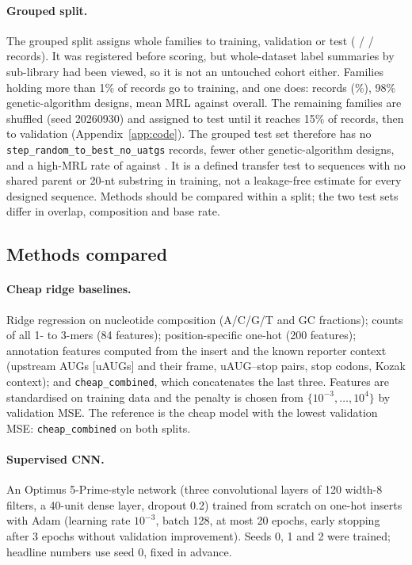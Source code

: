 \documentclass[11pt]{article}
\newcommand{\m}[1]{\texttt{#1}}
\begin{document}
\paragraph{Grouped split.} The grouped split assigns whole families to training, validation or test
(\GrpTrain{} / \GrpVal{} / \GrpTest{} records). It was registered before scoring, but whole-dataset label
summaries by sub-library had been viewed, so it is not an untouched cohort either. Families holding more than 1\%
of records go to training, and one does: \LargestComponent{} records (\LargestShare\%), 98\% genetic-algorithm
designs, mean MRL \LargestMean{} against \AllMean{} overall. The remaining families are shuffled (seed 20260930)
and assigned to test until it reaches 15\% of records, then to validation (Appendix~\ref{app:code}). The grouped
test set therefore has no \m{step\_random\_to\_best\_no\_uatgs} records, fewer other genetic-algorithm designs, and
a high-MRL rate of \GrpBase{} against \RandBase{}. It is a defined transfer test to sequences with no shared parent
or 20-nt substring in training, not a leakage-free estimate for every designed sequence. Methods should be
compared within a split; the two test sets differ in overlap, composition and base rate.

\subsection{Methods compared}\label{sec:models}
\paragraph{Cheap ridge baselines.} Ridge regression on nucleotide composition (A/C/G/T and GC fractions); counts of
all 1- to 3-mers (84 features); position-specific one-hot (200 features); annotation features computed from the
insert and the known reporter context (upstream AUGs [uAUGs] and their frame, uAUG--stop pairs, stop codons,
Kozak context); and \m{cheap\_combined}, which concatenates the last three. Features are standardised on training
data and the penalty is chosen from $\{10^{-3}, \dots, 10^{4}\}$ by validation MSE. The reference is the cheap
model with the lowest validation MSE: \m{cheap\_combined} on both splits.

\paragraph{Supervised CNN.} An Optimus 5-Prime-style network (three convolutional layers of 120 width-8 filters,
a 40-unit dense layer, dropout 0.2) trained from scratch on one-hot inserts with Adam (learning rate $10^{-3}$,
batch 128, at most 20 epochs, early stopping after 3 epochs without validation improvement). Seeds 0, 1 and 2 were
trained; headline numbers use seed 0, fixed in advance.
\end{document}
